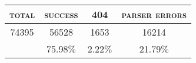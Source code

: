 \begin{tabular}{cccc} 
 \toprule 
\textsc{total} & \textsc{success} & \textsc{404} & \textsc{parser errors} \\ 
 \midrule 
74395&56528&1653&16214\\ 
&75.98$\%$&2.22$\%$&21.79$\%$\\ 
\bottomrule 
 \end{tabular}